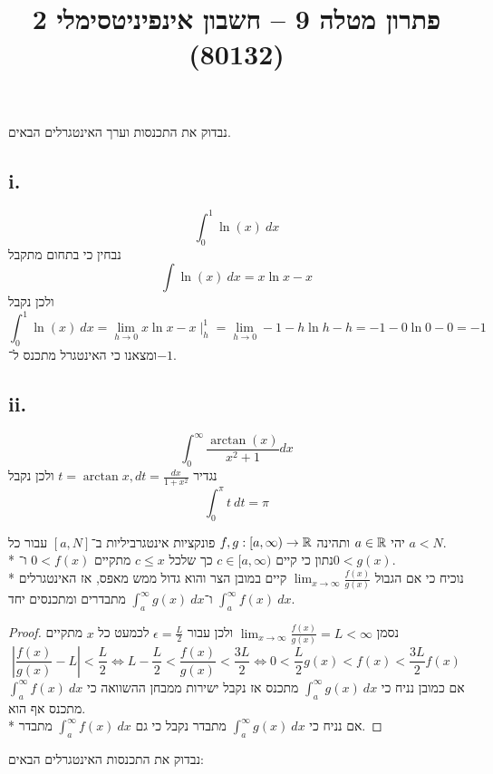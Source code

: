 
\usepackage{tikz}
\DeclareMathOperator\arcsinh{arcsinh}
\title{פתרון מטלה 9 – חשבון אינפיניטסימלי 2 (80132)}


\maketitle
\maketitleprint{}

\Question{}
נבדוק את התכנסות וערך האינטגרלים הבאים.

\subsection{i.}
\[
	\int_{0}^{1} \ln(x)\ dx
\]
נבחין כי בתחום מתקבל
\[
	\int \ln(x)\ dx = x \ln x - x
\]
ולכן נקבל
\[
	\int_{0}^{1} \ln(x)\ dx
	= \lim_{h \to 0} x \ln x - x \mid_h^1
	= \lim_{h \to 0} -1 - h \ln h - h
	= -1 - 0 \ln 0 - 0
	= -1
\]
ומצאנו כי האינטגרל מתכנס ל־$-1$.

\subsection{ii.}
\[
	\int_{0}^{\infty} \frac{\arctan(x)}{x^2 + 1} dx
\]
נגדיר $t = \arctan x, dt = \frac{dx}{1 + x^2}$ ולכן נקבל
\[
	\int_{0}^{\pi} t\ dt = \pi
\]

\Question{}
יהי $a \in \mathbb{R}$ ותהינה $f, g : [a, \infty) \to \mathbb{R}$ פונקציות אינטגרביליות ב־$[a, N]$ עבור כל $a < N$. \\*
נתון כי קיים $c \in [a, \infty)$ כך שלכל $c \le x$ מתקיים $0 < f(x)$ ו־$0 < g(x)$. \\*
נוכיח כי אם הגבול $\lim_{x \to \infty} \frac{f(x)}{g(x)}$ קיים במובן הצר והוא גדול ממש מאפס, אז האינטגרלים $\int_{a}^{\infty} f(x)\ dx$ ו־$\int_{a}^{\infty} g(x)\ dx$ מתבדרים ומתכנסים יחד.
\begin{proof}
	נסמן $\lim_{x \to \infty} \frac{f(x)}{g(x)} = L < \infty$ ולכן עבור $\epsilon = \frac{L}{2}$ לכמעט כל $x$ מתקיים
	\[
		\left| \frac{f(x)}{g(x)} - L \right| < \frac{L}{2}
		\iff
		L - \frac{L}{2} < \frac{f(x)}{g(x)} < \frac{3L}{2}
		\iff
		0 < \frac{L}{2} g(x) < f(x) < \frac{3L}{2} f(x)
	\]
	אם כמובן נניח כי $\int_{a}^{\infty} g(x)\ dx$ מתכנס אז נקבל ישירות ממבחן ההשוואה כי $\int_{a}^{\infty} f(x)\ dx$ מתכנס אף הוא. \\*
	אם נניח כי $\int_{a}^{\infty} g(x)\ dx$ מתבדר נקבל כי גם $\int_{a}^{\infty} f(x)\ dx$ מתבדר.
\end{proof}

\Question{}
נבדוק את התכנסות האינטגרלים הבאים:

